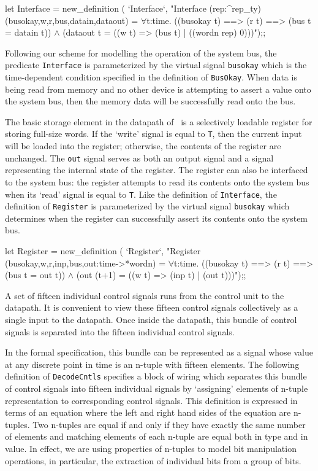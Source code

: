 \begintt
let Interface = new_definition (
  `Interface`,
  "Interface (rep:^rep_ty) (busokay,w,r,bus,datain,dataout) =
    \(\forall\)t:time.
      ((busokay t) ==> (r t) ==> (bus t = datain t)) \(\wedge\)
      (dataout t = ((w t) => (bus t) | ((wordn rep) 0)))");;
\endtt

Following our scheme for modelling the operation of the system bus,
the predicate \verb"Interface" is parameterized by
the virtual signal \verb"busokay" which is the
time-dependent condition specified in the definition of \verb"BusOkay".
When data is being read from memory and no other device is attempting to
assert a value onto the system bus, then the memory data will be successfully
read onto the bus.

The basic storage element in the datapath of \Tamarack\ is a
selectively loadable register for storing full-size words.
If the `write' signal is equal to \verb"T", then
the current input will be loaded into the register;
otherwise, the contents of the register are unchanged.
The \verb"out" signal serves as both an output signal and
a signal representing the internal state of the register.
The register can also be interfaced to the system bus:
the register attempts to read its contents onto the system bus
when its `read' signal is equal to \verb"T".
Like the definition of \verb"Interface",
the definition of \verb"Register" is parameterized by the virtual
signal \verb"busokay" which determines when the register can successfully
assert its contents onto the system bus.

\begintt
let Register = new_definition (
  `Register`,
  "Register (busokay,w,r,inp,bus,out:time->*wordn) =
    \(\forall\)t:time.
      ((busokay t) ==> (r t) ==> (bus t = out t)) \(\wedge\)
      (out (t+1) = ((w t) => (inp t) | (out t)))");;
\endtt

A set of fifteen individual control signals runs from the control
unit to the datapath.
It is convenient to view these fifteen control signals collectively
as a single input to the datapath.
Once inside the datapath, this bundle of control signals is separated
into the fifteen individual control signals.

In the formal specification,
this bundle can be represented as
a signal whose value at any discrete point in time is
an n-tuple with fifteen elements.
The following definition of \verb"DecodeCntls" specifies
a block of wiring which separates this bundle
of control signals into fifteen individual signals by `assigning'
elements of n-tuple representation to corresponding control signals.
This definition is expressed in terms of an equation where the left and
right hand sides of the equation are n-tuples.
Two n-tuples are equal if and only if
they have exactly the same number of elements and matching elements of each
n-tuple are equal both in type and in value.
In effect, we are using properties of \mbox{n-tuples}
to model bit manipulation operations,
in particular, the extraction of individual bits from a group of bits.

